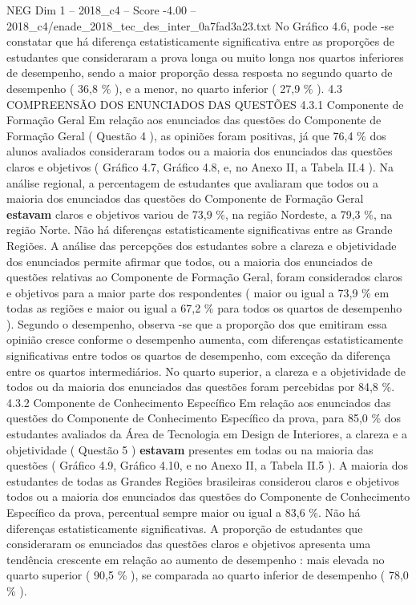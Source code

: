 \begin{textsample}{NEG Dim 1 – 2018\_c4 – Score -4.00 – 2018\_c4/enade\_2018\_tec\_des\_inter\_0a7fad3a23.txt}
No Gráfico 4.6, pode -se constatar que há diferença estatisticamente significativa entre as proporções de estudantes que consideraram a prova longa ou muito longa nos quartos inferiores de desempenho, sendo a maior proporção dessa resposta no segundo quarto de desempenho ( 36,8 \% ), e a menor, no quarto inferior ( 27,9 \% ). 4.3 COMPREENSÃO DOS ENUNCIADOS DAS QUESTÕES 4.3.1 Componente de Formação Geral Em relação aos enunciados das questões do Componente de Formação Geral ( Questão 4 ), as opiniões foram positivas, já que 76,4 \% dos alunos avaliados consideraram todos ou a maioria dos enunciados das questões claros e objetivos ( Gráfico 4.7, Gráfico 4.8, e, no Anexo II, a Tabela II.4 ).
Na análise regional, a percentagem de estudantes que avaliaram que todos ou a maioria dos enunciados das questões do Componente de Formação Geral \textbf{estavam} claros e objetivos variou de 73,9 \%, na região Nordeste, a 79,3 \%, na região Norte.
Não há diferenças estatisticamente significativas entre as Grande Regiões.
A análise das percepções dos estudantes sobre a clareza e objetividade dos enunciados permite afirmar que todos, ou a maioria dos enunciados de questões relativas ao Componente de Formação Geral, foram considerados claros e objetivos para a maior parte dos respondentes ( maior ou igual a 73,9 \% em todas as regiões e maior ou igual a 67,2 \% para todos os quartos de desempenho ).
Segundo o desempenho, observa -se que a proporção dos que emitiram essa opinião cresce conforme o desempenho aumenta, com diferenças estatisticamente significativas entre todos os quartos de desempenho, com exceção da diferença entre os quartos intermediários.
No quarto superior, a clareza e a objetividade de todos ou da maioria dos enunciados das questões foram percebidas por 84,8 \%. 4.3.2 Componente de Conhecimento Específico Em relação aos enunciados das questões do Componente de Conhecimento Específico da prova, para 85,0 \% dos estudantes avaliados da Área de Tecnologia em Design de Interiores, a clareza e a objetividade ( Questão 5 ) \textbf{estavam} presentes em todas ou na maioria das questões ( Gráfico 4.9, Gráfico 4.10, e no Anexo II, a Tabela II.5 ).
A maioria dos estudantes de todas as Grandes Regiões brasileiras considerou claros e objetivos todos ou a maioria dos enunciados das questões do Componente de Conhecimento Específico da prova, percentual sempre maior ou igual a 83,6 \%.
Não há diferenças estatisticamente significativas.
A proporção de estudantes que consideraram os enunciados das questões claros e objetivos apresenta uma tendência crescente em relação ao aumento de desempenho : mais elevada no quarto superior ( 90,5 \% ), se comparada ao quarto inferior de desempenho ( 78,0 \% ).

\end{textsample}
